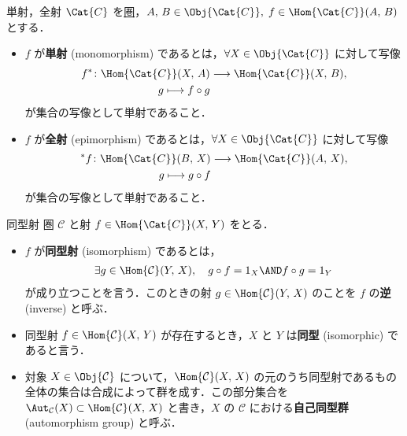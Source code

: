 \documentclass[algtopo_main]{subfiles}
\begin{document}
\begin{mydef}[label=def:mono-epi]{単射，全射}
    $\Cat{C}$ を\hyperref[def:category]{圏}，$A,\, B \in \Obj{\Cat{C}},\; f \in \Hom{\Cat{C}}(A,\, B)$ とする．
    \begin{itemize}
        \item $f$ が\textbf{単射} (monomorphism) であるとは，$\forall X \in \Obj{\Cat{C}}$ に対して写像
        \begin{align}
            f^* \colon \Hom{\Cat{C}} (X,\, A) &\lto \Hom{\Cat{C}} (X,\, B), \\
            g \lmto f \circ g
        \end{align}
        が集合の写像として単射であること．
        \item $f$ が\textbf{全射} (epimorphism) であるとは，$\forall  X \in \Obj{\Cat{C}}$ に対して写像
        \begin{align}
            {}^* f \colon \Hom{\Cat{C}} (B,\, X) &\lto \Hom{\Cat{C}} (A,\, X), \\
            g \lmto g \circ f
        \end{align}
        が集合の写像として単射であること．
    \end{itemize}
\end{mydef}


\begin{mydef}[label=def:isomorphism]{同型射}
    圏 $\mathcal{C}$ と射 $f \in \Hom{\Cat{C}}(X,\, Y)$ をとる．
    \begin{itemize}
        \item $f$ が\textbf{同型射} (isomorphism) であるとは，
        \begin{align}
            \exists g \in \Hom{\mathcal{C}}(Y,\, X),\quad g \circ f = 1_X \AND f \circ g = 1_Y
        \end{align}
        が成り立つことを言う．このときの射 $g \in \Hom{\mathcal{C}}(Y,\, X)$ のことを $f$ の\textbf{逆} (inverse) と呼ぶ．
        \item 同型射 $f \in \Hom{\mathcal{C}}(X,\, Y)$ が存在するとき，$X$ と $Y$ は\textbf{同型} (isomorphic) であると言う．
        \item 対象 $X \in \Obj{\mathcal{C}}$ について，$\Hom{\mathcal{C}}(X,\, X)$ の元のうち同型射であるもの全体の集合は合成によって群を成す．この部分集合を $\Aut_{\mathcal{C}}(X) \subset \Hom{\mathcal{C}}(X,\, X)$ と書き，$X$ の $\mathcal{C}$ における\textbf{自己同型群} (automorphism group) と呼ぶ．
    \end{itemize}
\end{mydef}
\end{document}
